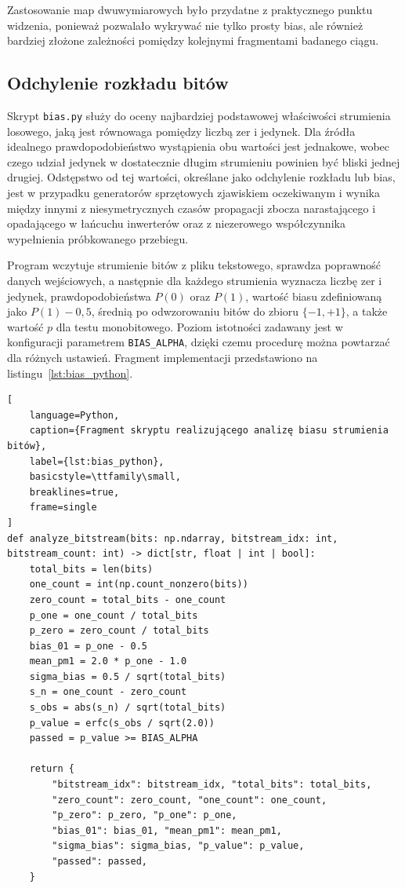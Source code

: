 Zastosowanie map dwuwymiarowych było przydatne z praktycznego punktu widzenia,
ponieważ pozwalało wykrywać nie tylko prosty bias, ale również bardziej złożone
zależności pomiędzy kolejnymi fragmentami badanego ciągu.

\subsection{Odchylenie rozkładu bitów}

Skrypt \texttt{bias.py} służy do oceny najbardziej podstawowej właściwości strumienia
losowego, jaką jest równowaga pomiędzy liczbą zer i jedynek. Dla źródła idealnego
prawdopodobieństwo wystąpienia obu wartości jest jednakowe, wobec czego udział jedynek
w dostatecznie długim strumieniu powinien być bliski jednej drugiej. Odstępstwo od tej
wartości, określane jako odchylenie rozkładu lub bias, jest w przypadku generatorów
sprzętowych zjawiskiem oczekiwanym i wynika między innymi z niesymetrycznych czasów
propagacji zbocza narastającego i opadającego w łańcuchu inwerterów oraz z niezerowego
współczynnika wypełnienia próbkowanego przebiegu.

Program wczytuje strumienie bitów z pliku tekstowego, sprawdza poprawność danych
wejściowych, a następnie dla każdego strumienia wyznacza liczbę zer i jedynek,
prawdopodobieństwa $P(0)$ oraz $P(1)$, wartość biasu zdefiniowaną jako $P(1)-0{,}5$,
średnią po odwzorowaniu bitów do zbioru $\{-1,+1\}$, a także wartość $p$ dla testu
monobitowego. Poziom istotności zadawany jest w konfiguracji parametrem
\texttt{BIAS\_ALPHA}, dzięki czemu procedurę można powtarzać dla różnych ustawień.
Fragment implementacji przedstawiono na listingu~\ref{lst:bias_python}.

\begin{lstlisting}[
    language=Python,
    caption={Fragment skryptu realizującego analizę biasu strumienia bitów},
    label={lst:bias_python},
    basicstyle=\ttfamily\small,
    breaklines=true,
    frame=single
]
def analyze_bitstream(bits: np.ndarray, bitstream_idx: int, bitstream_count: int) -> dict[str, float | int | bool]:
    total_bits = len(bits)
    one_count = int(np.count_nonzero(bits))
    zero_count = total_bits - one_count
    p_one = one_count / total_bits
    p_zero = zero_count / total_bits
    bias_01 = p_one - 0.5
    mean_pm1 = 2.0 * p_one - 1.0
    sigma_bias = 0.5 / sqrt(total_bits)
    s_n = one_count - zero_count
    s_obs = abs(s_n) / sqrt(total_bits)
    p_value = erfc(s_obs / sqrt(2.0))
    passed = p_value >= BIAS_ALPHA

    return {
        "bitstream_idx": bitstream_idx, "total_bits": total_bits,
        "zero_count": zero_count, "one_count": one_count,
        "p_zero": p_zero, "p_one": p_one,
        "bias_01": bias_01, "mean_pm1": mean_pm1,
        "sigma_bias": sigma_bias, "p_value": p_value,
        "passed": passed,
    }
\end{lstlisting}

